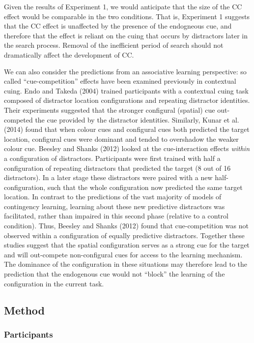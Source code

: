 \documentclass[
  man,
  floatsintext,
  longtable,
  nolmodern,
  notxfonts,
  notimes,
  colorlinks=true,linkcolor=blue,citecolor=blue,urlcolor=blue]{apa7}
\begin{document}
Given the results of Experiment 1, we would anticipate that the size of
the CC effect would be comparable in the two conditions. That is,
Experiment 1 suggests that the CC effect is unaffected by the presence
of the endogneous cue, and therefore that the effect is reliant on the
cuing that occurs by distractors later in the search process. Removal of
the inefficient period of search should not dramatically affect the
development of CC.

We can also consider the predictions from an associative learning
perspective: so called ``cue-competition'' effects have been examined
previously in contextual cuing. Endo and Takeda (2004) trained
participants with a contextual cuing task composed of distractor
location configurations and repeating distractor identities. Their
experiments suggested that the stronger configural (spatial) cue
out-competed the cue provided by the distractor identities. Similarly,
Kunar et al. (2014) found that when colour cues and configural cues both
predicted the target location, configural cues were dominant and tended
to overshadow the weaker colour cue. Beesley and Shanks (2012) looked at
the cue-interaction effects \emph{within} a configuration of
distractors. Participants were first trained with half a configuration
of repeating distractors that predicted the target (8 out of 16
distractors). In a later stage these distractors were paired with a new
half-configuration, such that the whole configuration now predicted the
same target location. In contrast to the predictions of the vast
majority of models of contingency learning, learning about these new
predictive distractors was facilitated, rather than impaired in this
second phase (relative to a control condition). Thus, Beesley and Shanks
(2012) found that cue-competition was not observed within a
configuration of equally predictive distractors. Together these studies
suggest that the spatial configuration serves as a strong cue for the
target and will out-compete non-configural cues for access to the
learning mechanism. The dominance of the configuration in these
situations may therefore lead to the prediction that the endogenous cue
would not ``block'' the learning of the configuration in the current
task.

\subsection{Method}\label{method-1}

\subsubsection{Participants}\label{participants-1}
\end{document}
